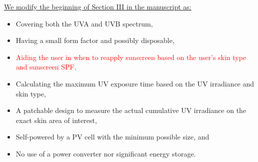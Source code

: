 \documentclass[onecolumn]{IEEEconf}
\begin{document}
\begin{description}
\underline{We modify the beginning of Section III in the manuscript as:}\\

\begin{itemize}
\item Covering both the UVA and UVB spectrum,
\item Having a small form factor and possibly disposable,
\item \textcolor{red}{Aiding the user in when to reapply sunscreen based on the user’s skin type and sunscreen SPF,}
\item Calculating the maximum UV exposure time based on the UV irradiance and skin type,
\item A patchable design to measure the actual cumulative UV irradiance on the exact skin area of interest,
\item Self-powered by a PV cell with the minimum possible size, and
\item No use of a power converter nor significant energy storage.
\end{itemize}

\end{description}

\pagebreak
\end{document}
